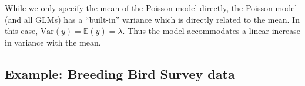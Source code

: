 While we only specify the mean of the Poisson model directly, the
Poisson model (and all GLMs) has a ``built-in'' variance which is
directly related to the mean. In this case, $\mbox{Var}(y) = \mathbb{E}(y) =
\lambda$. Thus the model accommodates a linear increase in variance
with the mean.



\subsection{Example: Breeding Bird Survey data}

